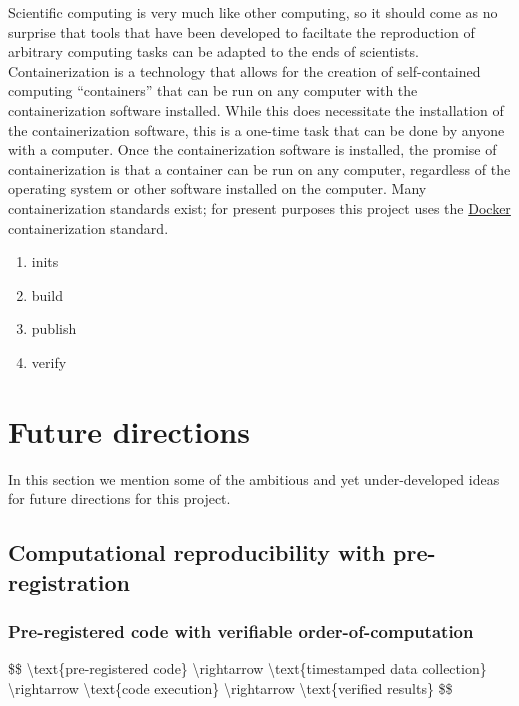 Scientific computing is very much like other computing, so it should come as no surprise that tools that have been developed to faciltate the reproduction of arbitrary computing tasks can be adapted to the ends of scientists. Containerization is a technology that allows for the creation of self-contained computing ``containers'' that can be run on any computer with the containerization software installed. While this does necessitate the installation of the containerization software, this is a one-time task that can be done by anyone with a computer. Once the containerization software is installed, the promise of containerization is that a container can be run on any computer, regardless of the operating system or other software installed on the computer. Many containerization standards exist; for present purposes this project uses the \href{https://www.docker.com/}{Docker} containerization standard.

\begin{enumerate}
\itemsep -0.2em
\item inits 
\item build
\item publish
\item verify
\end{enumerate}

\hypertarget{future-directions}{%
\section{Future directions}\label{future-directions}}

In this section we mention some of the ambitious and yet under-developed ideas for future directions for this project.

\hypertarget{computational-reproducibility-with-pre-registration}{%
\subsection{Computational reproducibility with pre-registration}\label{computational-reproducibility-with-pre-registration}}

\hypertarget{pre-registered-code-with-verifiable-order-of-computation}{%
\subsubsection{Pre-registered code with verifiable order-of-computation}\label{pre-registered-code-with-verifiable-order-of-computation}}

\$\$ \textbackslash{}text\{pre-registered code\} \textbackslash{}rightarrow \textbackslash{}text\{timestamped data collection\} \textbackslash{}rightarrow \textbackslash{}text\{code execution\} \textbackslash{}rightarrow \textbackslash{}text\{verified results\} \$\$

